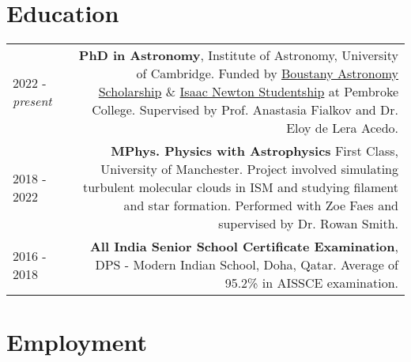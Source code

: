 \documentclass{article}
\begin{document}
\begin{comment}
\section*{Skills}

\begin{longtable}{L!{\vrule}R}
	Programming & \textbf{Proficient}: Python, MATLAB, \textbf{Experienced}: C++, Java\\
	Markup & \textbf{Experienced}: LaTeX, Wikitext, \textbf{Intermediate}:  HTML, CSS, reStructuredText, Markdown \\
	Languages & \textbf{Proficient}: English, Hindi, \textbf{Intermediate}: Gujarati
\end{longtable}
\end{comment}

\section*{Education}
\begin{longtable}{L!{\vrule}R}
	2022 - \textit{present} & \textbf{PhD in Astronomy}, Institute of Astronomy, University of Cambridge. Funded by \href{https://boustany-foundation.org/scholarship-programmes/astronomy-phd-cambridge/}{Boustany Astronomy Scholarship} \& \href{https://www.cambridgetrust.org/partners/institute-of-astronomy}{Isaac Newton Studentship} at Pembroke College. Supervised by Prof. Anastasia Fialkov and Dr. Eloy de Lera Acedo. \\
	2018 - 2022 & \textbf{MPhys. Physics with Astrophysics} First Class, University of Manchester. Project involved simulating turbulent molecular clouds in ISM and studying filament and star formation. Performed with Zoe Faes and supervised by Dr. Rowan Smith. \\
	2016 - 2018 & \textbf{All India Senior School Certificate Examination}, DPS - Modern Indian School, Doha, Qatar. Average of 95.2\% in AISSCE examination.
\end{longtable}

\section*{Employment}
\end{document}

